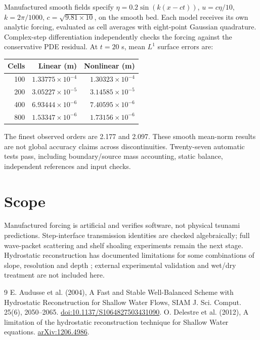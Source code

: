 \documentclass[11pt]{article}
\begin{document}
Manufactured smooth fields specify $\eta=0.2\sin(k(x-ct))$,
$u=c\eta/10$, $k=2\pi/1000$, $c=\sqrt{9.81\times10}$, on the smooth bed.
Each model receives its own analytic forcing, evaluated as cell averages
with eight-point Gaussian quadrature. Complex-step differentiation independently
checks the forcing against the conservative PDE residual.
At $t=20$ s, mean $L^1$ surface errors are:
\begin{center}\begin{tabular}{rrr}\toprule
Cells & Linear (m) & Nonlinear (m)\\\midrule
100 & $1.33775\times10^{-4}$ & $1.30323\times10^{-4}$\\
200 & $3.05227\times10^{-5}$ & $3.14585\times10^{-5}$\\
400 & $6.93444\times10^{-6}$ & $7.40595\times10^{-6}$\\
800 & $1.53347\times10^{-6}$ & $1.73156\times10^{-6}$\\\bottomrule
\end{tabular}\end{center}
The finest observed orders are 2.177 and 2.097. These smooth mean-norm results
are not global accuracy claims across discontinuities. Twenty-seven automatic
tests pass, including boundary/source mass accounting, static balance,
independent references and input checks.

\section{Scope}
Manufactured forcing is artificial and verifies software, not physical tsunami
predictions. Step-interface transmission identities are checked algebraically;
full wave-packet scattering and shelf shoaling experiments remain the next stage.
Hydrostatic reconstruction has documented limitations for some combinations
of slope, resolution and depth \cite{delestre2012}; external experimental
validation and wet/dry treatment are not included here.
\begin{thebibliography}{9}
 E. Audusse et al. (2004), A Fast and Stable Well-Balanced
Scheme with Hydrostatic Reconstruction for Shallow Water Flows,
SIAM J. Sci. Comput. 25(6), 2050--2065.
\href{https://doi.org/10.1137/S1064827503431090}{doi:10.1137/S1064827503431090}.
 O. Delestre et al. (2012), A limitation of the hydrostatic
reconstruction technique for Shallow Water equations.
\href{https://arxiv.org/abs/1206.4986}{arXiv:1206.4986}.
\end{thebibliography}
\end{document}
